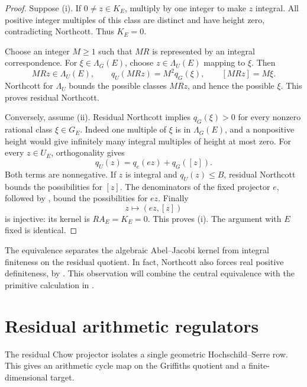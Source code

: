 \documentclass[11pt,a4paper]{article}
\theoremstyle{definition}
\numberwithin{equation}{section}
\begin{document}
\begin{proof}
Suppose (i). If \(0\ne z\in K_E\), multiply by one integer to
make \(z\) integral. All positive integer multiples of this class
are distinct and have height zero, contradicting Northcott.
Thus \(K_E=0\).

Choose an integer \(M\ge1\) such that \(MR\) is represented by
an integral correspondence. For \(\xi\in\Lambda_G(E)\), choose
\(z\in\Lambda_U(E)\) mapping to \(\xi\). Then
\[
 MRz\in\Lambda_U(E),\qquad
 q_U(MRz)=M^2q_G(\xi),\qquad [MRz]=M\xi.
\]
Northcott for \(\Lambda_U\) bounds the possible classes \(MRz\),
and hence the possible \(\xi\). This proves residual Northcott.

Conversely, assume (ii). Residual Northcott implies
\(q_G(\xi)>0\) for every nonzero rational class \(\xi\in G_E\).
Indeed one multiple of \(\xi\) is in \(\Lambda_G(E)\), and a
nonpositive height would give infinitely many integral multiples
of height at most zero. For every \(z\in U_E\), orthogonality gives
\begin{equation}\label{eq:central-norm-split}
 q_U(z)=q_e(ez)+q_G([z]).
\end{equation}
Both terms are nonnegative. If \(z\) is integral and
\(q_U(z)\le B\), residual Northcott bounds the possibilities for
\([z]\). The denominators of the fixed projector \(e\), followed
by , bound the possibilities for \(ez\).
Finally
\[
 z\longmapsto(ez,[z])
\]
is injective: its kernel is \(RA_E=K_E=0\). This proves (i).
The argument with \(E\) fixed is identical.
\end{proof}

The equivalence separates the algebraic Abel--Jacobi kernel from
integral finiteness on the residual quotient. In fact, Northcott
also forces real positive definiteness, by
. This observation will combine the
central equivalence with the primitive calculation in
.




\section{Residual arithmetic regulators}\label{sec:regulators}

The residual Chow projector isolates a single geometric
Hochschild--Serre row. This gives an arithmetic cycle map on the
Griffiths quotient and a finite-dimensional target.
\end{document}
